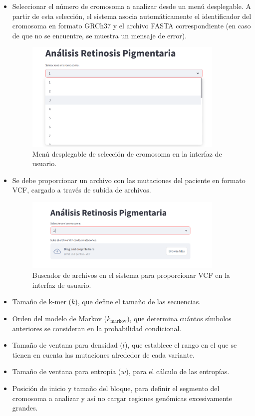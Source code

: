 \documentclass[11pt,spanish,listoffigures,listoftables]{tfgetsinf}
\begin{document}
\begin{itemize}
   \item Seleccionar el número de cromosoma a analizar desde un menú desplegable. A partir de esta selección, el sistema asocia automáticamente el identificador del cromosoma en formato GRCh37 y el archivo \ac{FASTA} correspondiente (en caso de que no se encuentre, se muestra un mensaje de error). 
   \begin{figure}[H]
      \centering
      \includegraphics[width=0.9\textwidth]{cromosoma_RP.png}
      \caption{Menú desplegable de selección de cromosoma en la interfaz de usuario.}
      \label{fig:etiqueta_opcional6}
   \end{figure}
   \item Se debe proporcionar un archivo con las mutaciones del paciente en formato \ac{VCF}, cargado a través de subida de archivos. 
   \begin{figure}[H]
      \centering
      \includegraphics[width=0.9\textwidth]{VCF_RP.png}
      \caption{Buscador de archivos en el sistema para proporcionar \ac{VCF} en la interfaz de usuario.}
      \label{fig:etiqueta_opcional7}
   \end{figure}
   \item Tamaño de k-mer ($k$), que define el tamaño de las secuencias. 
   \item Orden del modelo de Markov ($k_{\text{markov}}$), que determina cuántos símbolos anteriores se consideran en la probabilidad condicional.
   \item Tamaño de ventana para densidad ($l$), que establece el rango en el que se tienen en cuenta las mutaciones alrededor de cada variante. 
   \item Tamaño de ventana para entropía ($w$), para el cálculo de las entropías.
   \item Posición de inicio y tamaño del bloque, para definir el segmento del cromosoma a analizar y así no cargar regiones genómicas excesivamente grandes. 
\end{itemize}
\end{document}
